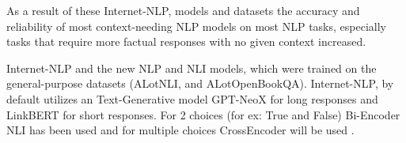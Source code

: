 As a result of these Internet-NLP, models and datasets the accuracy and reliability of most context-needing NLP models on most NLP tasks, especially tasks that require more factual responses with no given context increased.

Internet-NLP and the new NLP and NLI models, which were trained on the general-purpose datasets (ALotNLI, and ALotOpenBookQA). Internet-NLP, by default utilizes an Text-Generative model GPT-NeoX \cite{gpt-neox-library, gpt-neox-20b} for long responses and LinkBERT \cite{yasunaga-etal-2022-linkbert} for short responses. For 2 choices (for ex: True and False) Bi-Encoder NLI has been used and for multiple choices CrossEncoder will be used \cite{thakur-2020-AugSBERT}.

\begin{comment}
In this paper, we propose Internet-NLP, a novel control-flow wrapper abstraction that allows existing context-dependent Natural Language Processing (NLP) models to utilize data from the internet as context, enabling them to function without any given context. Using the internet as a context source is particularly useful for NLP models that require real-time or current information to perform their tasks accurately.

Internet-NLP can be fine-tuned alongside existing NLP models using its config settings and optimizations of Masked Language Models (MLM) and Text2Text Models. This can improve search queries and retrieve more accurate and reliable data. Additionally, Internet-NLP can utilize large NLP models such as GPT-3 or GPT-NeoX-20B for multi-turn NLP tasks and can be improved through Reinforcement Learning from user interactions. Caches of internet results can also be tuned to enable faster computation for repetitive tasks.

To assist Internet-NLP, we also present a suite of new NLP and Natural Language Inference (NLI) models, including GPT-NeoX-20b for open-book question and answer (QA), LinkBERT for crossEncoder NLI, T5 for a statement to query and answer to context NLP. These models have been specifically designed to work with Internet-NLP to improve the accuracy and reliability of context-dependent NLP tasks. We also introduce two new general-purpose QA and NLI datasets: ALotNLI, which is made from ANLI, MultiNLI, and SNLI, and ALotOpenBookQA, which is made from CoQA, Natural Questions, and SQuAD. These datasets provide a diverse range of contexts and information that can be used to train and evaluate the performance of Internet-NLP and the accompanying NLP and NLI models.


\end{comment}
